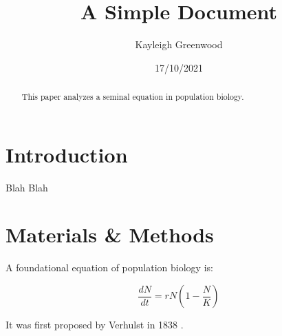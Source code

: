 \documentclass[12pt]{article}
\title{A Simple Document}
\author{Kayleigh Greenwood}
\date{17/10/2021}
\begin{document}
  \maketitle

  \begin{abstract}
    This paper analyzes a seminal equation in population biology.
  \end{abstract}

  \section{Introduction}
    Blah Blah

  \section{Materials \& Methods}

  A foundational equation of population biology is:

  \begin{equation}
    \frac{dN}{dt} = r N (1 - \frac{N}{K})
  \end{equation}

  It was first proposed by Verhulst in 1838 \cite{verhulst1838notice}.

  

  
\end{document}

